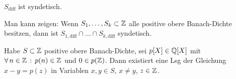 \documentclass{cheat-sheet}
\begin{document}
\begin{kor}
  $S_{\text{diff}}$ ist syndetisch.
\end{kor}

\begin{bem}
  Man kann zeigen: Wenn $S_1, \ldots, S_k \subset \mathbb{Z}$ alle positive obere Banach-Dichte besitzen, dann ist $S_{1,\text{diff}} \cap \ldots \cap S_{k,\text{diff}}$ syndetisch.
\end{bem}

\begin{thm}
  Habe $S \subset \mathbb{Z}$ positive obere Banach-Dichte, sei $p[X] \in \mathbb{Q}[X]$ mit $\forall \, {n \in \mathbb{Z}} \,:\, p(n) \in \mathbb{Z}$ und $0 \in p(\mathbb{Z})$.
  Dann existiert eine Lsg der Gleichung $x - y = p(z)$ in Variablen $x, y \in S$, $x \neq y$, $z \in \mathbb{Z}$.
\end{thm}
\end{document}
